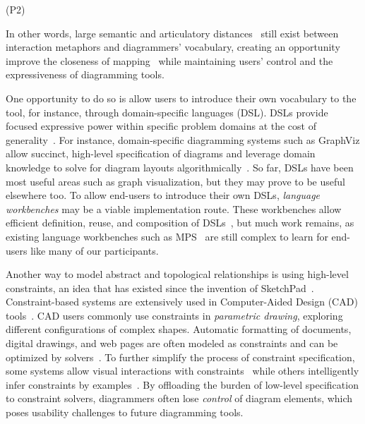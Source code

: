     (P2)
    
In other words, large semantic and articulatory distances~\cite{DM-Seminal} still exist between interaction metaphors and diagrammers' vocabulary, creating an opportunity improve the closeness of mapping~\cite{green_usability_1996} while maintaining users' control and the expressiveness of diagramming tools. 

One opportunity to do so is allow users to introduce their own vocabulary to the tool, for instance, through domain-specific languages (DSL). DSLs provide focused expressive power within specific problem domains at the cost of generality~\cite{van_deursen_domain-specific_2000}. For instance, domain-specific diagramming systems such as GraphViz allow succinct, high-level specification of diagrams and leverage domain knowledge to solve for diagram layouts algorithmically~\cite{Graphviz}. So far, DSLs have been most useful areas such as graph visualization, but they may prove to be useful elsewhere too. To allow end-users to introduce their own DSLs,   \emph{language workbenches} may be a viable implementation route. These workbenches allow efficient definition, reuse, and composition of DSLs~\cite{stateLanguageWorkbench}, but much work remains, as existing language workbenches such as MPS~\cite{MPS} are still complex to learn for end-users like many of our participants. 

Another way to model abstract and topological relationships is using high-level constraints, an idea that has existed since the invention of SketchPad~\cite{sketchpad}. Constraint-based systems are extensively used in Computer-Aided Design (CAD) tools~\cite{constraintsCAD}. CAD users commonly use constraints in \emph{parametric drawing}, exploring different configurations of complex shapes. Automatic formatting of documents, digital drawings, and web pages are often modeled as constraints and can be optimized by solvers~\cite{DocumentFormatting, euclase}. To further simplify the process of constraint specification, some systems allow visual interactions with constraints~\cite{PBMLayout, gleicher_drawing_1994} while others intelligently infer constraints by examples~\cite{InferringConstraintsFromMultipleSnapshots}. By offloading the burden of low-level specification to constraint solvers, diagrammers often lose \emph{control} of diagram elements, which poses usability challenges to future diagramming tools.


